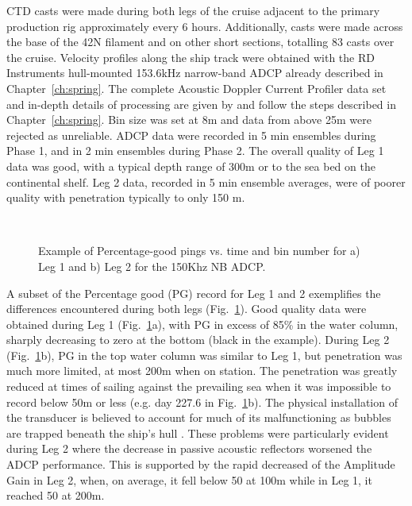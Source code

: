 CTD casts were made during both legs of the cruise adjacent to the
primary production rig approximately every 6 hours. Additionally,
casts were made across the base of the 42\deg N filament and on
other short sections, totalling 83 casts over the cruise. Velocity
profiles along the ship track were obtained with the RD
Instruments hull-mounted 153.6kHz narrow-band ADCP already
described in Chapter~\ref{ch:spring}. The complete Acoustic
Doppler Current Profiler data set and in-depth details of
processing are given by \citet{Torres99} and follow the steps
described in Chapter~\ref{ch:spring}. Bin size was set at 8m and
data from above 25m were rejected as unreliable. ADCP data were
recorded in 5 min ensembles during Phase 1, and in 2 min ensembles
during Phase 2. The overall quality of Leg 1 data was good, with a
typical depth range of 300m or to the sea bed on the continental
shelf.  Leg 2 data, recorded in 5 min ensemble averages, were of
poorer quality with penetration typically to only 150 m.
\begin{figure}
\centering \hspace*{-.5cm}\\
\caption{Example of Percentage-good pings vs. time and bin number
for a) Leg 1 and b) Leg 2 for the 150Khz NB ADCP.}
\label{fig:cd114pg}
\end{figure}

A subset of the Percentage good (PG) record for Leg 1 and 2
exemplifies the differences encountered during both legs
(Fig.~\ref{fig:cd114pg}). Good quality data were obtained during
Leg 1 (Fig.~\ref{fig:cd114pg}a), with PG in excess of 85\% in the
water column, sharply decreasing to zero at the bottom (black in
the example). During Leg 2 (Fig.~\ref{fig:cd114pg}b), PG in the
top water column was similar to Leg 1, but penetration was much
more limited, at most 200m when on station. The penetration was
greatly reduced at times of sailing against the prevailing sea
when it was impossible to record below 50m or less (e.g. day 227.6
in Fig.~\ref{fig:cd114pg}b). The physical installation of the
transducer is believed to account for much of its malfunctioning
as bubbles are trapped beneath the ship's hull \citep{New92}.
These problems were particularly evident during Leg 2 where the
decrease in passive acoustic reflectors worsened the ADCP
performance. This is supported by the rapid decreased of the
Amplitude Gain in Leg 2, when, on average, it fell below 50 at
100m while in Leg 1, it reached 50 at 200m.

